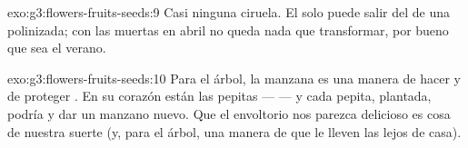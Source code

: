 \begin{solution}{exo:g3:flowers-fruits-seeds:9}
Casi ninguna ciruela. El  solo puede salir del  de una
 polinizada; con las  muertas en abril no queda nada que
transformar, por bueno que sea el verano.
\end{solution}

\begin{solution}{exo:g3:flowers-fruits-seeds:10}
Para el árbol, la manzana es una manera de hacer y de proteger
. En su corazón están las pepitas ---  --- y cada
pepita, plantada, podría  y dar un manzano nuevo. Que el
envoltorio nos parezca delicioso es cosa de nuestra suerte (y, para el
árbol, una manera de que le lleven las  lejos de casa).
\end{solution}
